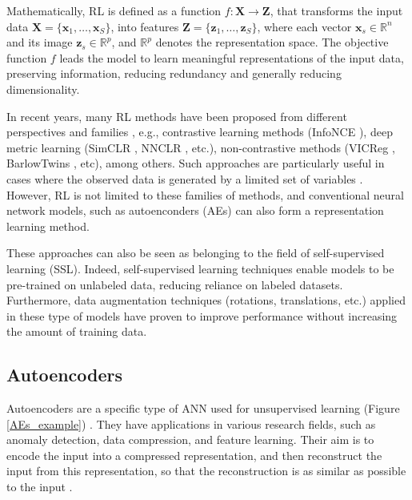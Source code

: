 \documentclass[journal,article,submit,pdftex,moreauthors]{Definitions/mdpi}
\begin{document}
Mathematically, \ac{RL} is defined as a function $f : \mathbf{X} \to \mathbf{Z}$, that transforms the input data $\mathbf{X} = \{\mathbf{x}_1, \dots, \mathbf{x}_S\}$, into features $\mathbf{Z} = \{\mathbf{z}_1, \dots, \mathbf{z}_S\}$, where each vector $\mathbf{x}_s \in \mathbb{R}^n$ and its image $\mathbf{z}_s \in \mathbb{R}^p$, and $\mathbb{R}^p$ denotes the representation space.
The objective function $f$ leads the model to learn meaningful representations of the input data, preserving information, reducing redundancy and generally reducing dimensionality.

In recent years, many \ac{RL} methods have been proposed from different perspectives and families \cite{Balestriero2023}, 
e.g., contrastive learning methods (InfoNCE \cite{Tschannen2019,LeKhac2020,Aitchison2021}), deep metric learning (SimCLR \cite{Chen2020,Bachman2019}, NNCLR \cite{Dwibedi2021}, etc.), non-contrastive methods (VICReg \cite{Bardes2021}, BarlowTwins \cite{Zbontar2021,Lisaius2024}, etc), among others.
Such approaches are particularly useful in cases where the observed data is generated by a limited set of variables \cite{Coifman2006}. 
However, \ac{RL} is not limited to these families of methods, and conventional neural network models, such as autoenconders (AEs) can also form a representation learning method.

These approaches can also be seen as belonging to the field of self-supervised learning (SSL). Indeed, self-supervised learning techniques enable models to be pre-trained on unlabeled data, reducing reliance on labeled datasets. Furthermore, data augmentation techniques (rotations, translations, etc.) applied in these type of models have proven to improve performance without increasing the amount of training data.

\subsection{Autoencoders}\label{aes}
Autoencoders are a specific type of ANN used for unsupervised learning (Figure \ref{AEs_example}) \cite{Bank2020, Bank2023}. They have applications in various research fields, such as anomaly detection, data compression, and feature learning. Their aim is to encode the input into a compressed representation, and then reconstruct the input from this representation, so that the reconstruction is as similar as possible to the input \cite{Tzelepi2022,Zhang2019}. 
\end{document}
